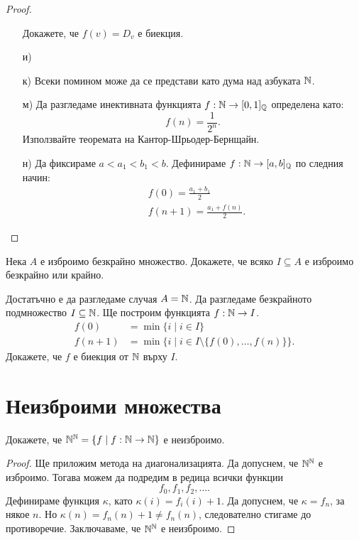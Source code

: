 \begin{proof}
\begin{enumerate}[a)]
    Докажете, че $f(v) = D_v$ е биекция.
  \item[и)]
    
  \item[к)]
    Всеки помином може да се представи като дума над азбуката $\mathbb{N}$.
  \item[м)]
    Да разгледаме инективната функцията $f:\mathbb{N} \to [0,1]_{\mathbb{Q}}$ определена като:
    \[f(n) = \frac{1}{2^n}.\]
    Използвайте теоремата на Кантор-Шрьодер-Бернщайн.
  \item[н)]
    Да фиксираме $a < a_1 < b_1 < b$.
    Дефинираме $f:\mathbb{N} \to [a,b]_{\mathbb{Q}}$ по следния начин:
    \begin{align*}
      & f(0) = \frac{a_1+b_1}{2}\\
      & f(n+1) = \frac{a_1+f(n)}{2}.
    \end{align*}
  \end{enumerate}
\end{proof}

\begin{problem}
  Нека $A$ е изброимо безкрайно множество.
  Докажете, че всяко $I \subseteq A$ е изброимо безкрайно или крайно.
\end{problem}
\begin{hint}
  Достатъчно е да разгледаме случая $A = \mathbb{N}$.
  Да разгледаме безкрайното подмножество $I \subseteq \mathbb{N}$.
  Ще построим функцията $f:\mathbb{N} \to I$.
  \begin{align*}
    f(0)   & = \min\{i \mid i \in I\}\\
    f(n+1) &= \min\{i \mid i \in I \setminus\{f(0),\dots,f(n)\}\}.
  \end{align*}
  Докажете, че $f$ е биекция от $\mathbb{N}$ върху $I$.
\end{hint}

\section{Неизброими множества}

\begin{problem}
  Докажете, че $\mathbb{N}^{\mathbb{N}} = \{f \mid f:\mathbb{N} \to \mathbb{N}\}$ е неизброимо.
\end{problem}
\begin{proof}
  Ще приложим метода на диагонализацията. 
  Да допуснем, че $\mathbb{N}^{\mathbb{N}}$ е изброимо.
  Тогава можем да подредим в редица всички функции \[f_0,f_1,f_2,\dots.\]
  Дефинираме функция $\kappa$, като $\kappa(i) = f_i(i)+1$.
  Да допуснем, че $\kappa = f_n$, за някое $n$.
  Но $\kappa(n) = f_n(n)+1 \neq f_n(n)$, следователно стигаме до противоречие.
  Заключаваме, че $\mathbb{N}^{\mathbb{N}}$ е неизброимо.
\end{proof}

